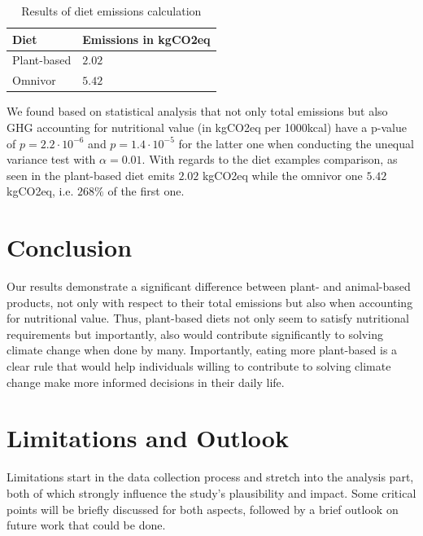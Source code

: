 \documentclass{article}
\begin{document}
\begin{table}[h]
  \caption{Results of diet emissions calculation}
  \label{tbl:results-diets}
  \centering
  \begin{tabular}{ll}
    \toprule
    Diet    & Emissions in kgCO2eq  \\
    \midrule
    Plant-based & $2.02$\\
    Omnivor    &  $5.42$\\
    \bottomrule
  \end{tabular}
\end{table}

We found based on statistical analysis that not only total emissions but also GHG accounting for nutritional value (in kgCO2eq per 1000kcal) have a p-value of  $p= 2.2\cdot10^{-6} $  and $p= 1.4\cdot10^{-5}$   for the latter one when conducting the unequal variance test with $\alpha = 0.01$. With regards to the diet examples comparison, as seen in  the plant-based diet emits $2.02$ kgCO2eq while the omnivor one $5.42$ kgCO2eq, i.e. $268\%$ of the first one.

\section{Conclusion}
\label{conclusion}
Our results demonstrate a significant difference between plant- and animal-based products, not only with respect to their total emissions but also when accounting for nutritional value. Thus, plant-based diets not only seem to satisfy nutritional requirements \cite{WHO2021} but importantly, also would contribute significantly to solving climate change when done by many. Importantly, eating more plant-based is a clear rule that would help individuals willing to contribute to solving climate change make more informed decisions in their daily life. 

\section{Limitations and Outlook}
\label{limitations}
Limitations start in the data collection process and stretch into the analysis part, both of which strongly influence the study's plausibility and impact. Some critical points will be briefly discussed for both aspects, followed by  a brief outlook on future work that could be done.
\end{document}
